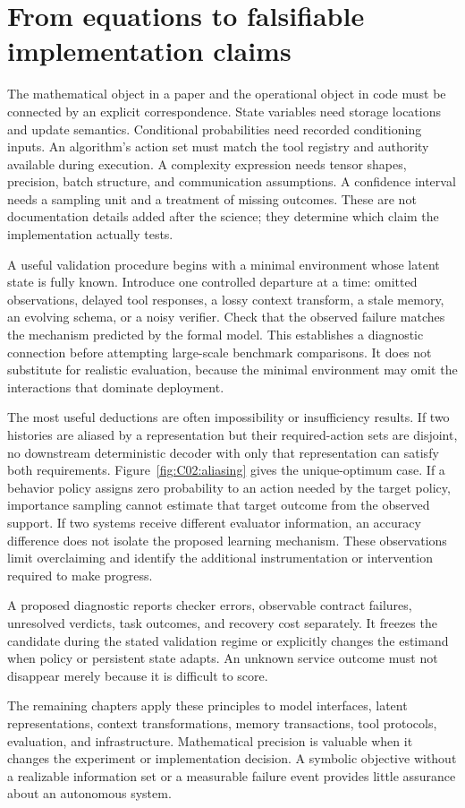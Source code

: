 \section{From equations to falsifiable implementation claims}\label{sec:C02:07}
The mathematical object in a paper and the operational object in code must be connected by an explicit correspondence. State variables need storage locations and update semantics. Conditional probabilities need recorded conditioning inputs. An algorithm's action set must match the tool registry and authority available during execution. A complexity expression needs tensor shapes, precision, batch structure, and communication assumptions. A confidence interval needs a sampling unit and a treatment of missing outcomes. These are not documentation details added after the science; they determine which claim the implementation actually tests.

A useful validation procedure begins with a minimal environment whose latent state is fully known. Introduce one controlled departure at a time: omitted observations, delayed tool responses, a lossy context transform, a stale memory, an evolving schema, or a noisy verifier. Check that the observed failure matches the mechanism predicted by the formal model. This establishes a diagnostic connection before attempting large-scale benchmark comparisons. It does not substitute for realistic evaluation, because the minimal environment may omit the interactions that dominate deployment.

The most useful deductions are often impossibility or insufficiency results. If two histories are aliased by a representation but their required-action sets are disjoint, no downstream deterministic decoder with only that representation can satisfy both requirements. Figure~\ref{fig:C02:aliasing} gives the unique-optimum case. If a behavior policy assigns zero probability to an action needed by the target policy, importance sampling cannot estimate that target outcome from the observed support. If two systems receive different evaluator information, an accuracy difference does not isolate the proposed learning mechanism. These observations limit overclaiming and identify the additional instrumentation or intervention required to make progress.

A proposed diagnostic reports checker errors, observable contract failures, unresolved verdicts, task outcomes, and recovery cost separately. It freezes the candidate during the stated validation regime or explicitly changes the estimand when policy or persistent state adapts. An unknown service outcome must not disappear merely because it is difficult to score.

The remaining chapters apply these principles to model interfaces, latent representations, context transformations, memory transactions, tool protocols, evaluation, and infrastructure. Mathematical precision is valuable when it changes the experiment or implementation decision. A symbolic objective without a realizable information set or a measurable failure event provides little assurance about an autonomous system.
